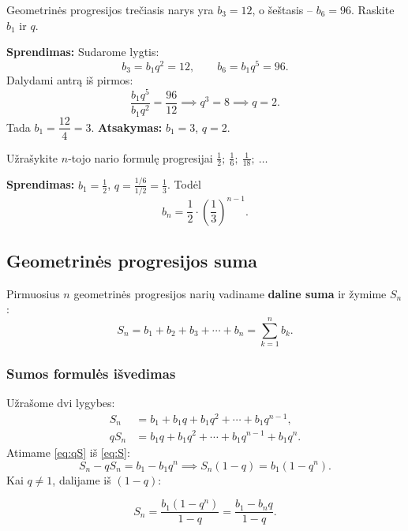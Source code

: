 \begin{exercise}
Geometrinės progresijos trečiasis narys yra $b_3 = 12$, o šeštasis – $b_6 = 96$. Raskite $b_1$ ir $q$.

\textbf{Sprendimas:} Sudarome lygtis:
\[
    b_3 = b_1 q^2 = 12, \qquad b_6 = b_1 q^5 = 96.
\]
Dalydami antrą iš pirmos:
\[
    \frac{b_1 q^5}{b_1 q^2} = \frac{96}{12} \implies q^3 = 8 \implies q = 2.
\]
Tada $b_1 = \dfrac{12}{4} = 3$. \textbf{Atsakymas:} $b_1 = 3$, $q = 2$.
\end{exercise}

\begin{exercise}
Užrašykite $n$-tojo nario formulę progresijai $\tfrac{1}{2};\ \tfrac{1}{6};\ \tfrac{1}{18};\ \ldots$

\textbf{Sprendimas:} $b_1 = \tfrac{1}{2}$, $q = \tfrac{1/6}{1/2} = \tfrac{1}{3}$. Todėl
\[
    b_n = \frac{1}{2} \cdot \left(\frac{1}{3}\right)^{n-1}.
\]
\end{exercise}

\subsection{Geometrinės progresijos suma}

\begin{definition}
Pirmuosius $n$ geometrinės progresijos narių vadiname \textbf{daline suma} ir žymime $S_n$:
\[
    S_n = b_1 + b_2 + b_3 + \cdots + b_n = \sum_{k=1}^{n} b_k.
\]
\end{definition}

\subsubsection*{Sumos formulės išvedimas}

Užrašome dvi lygybes:
\begin{align}
    S_n &= b_1 + b_1 q + b_1 q^2 + \cdots + b_1 q^{n-1}, \label{eq:S}\\
    q S_n &= b_1 q + b_1 q^2 + \cdots + b_1 q^{n-1} + b_1 q^{n}. \label{eq:qS}
\end{align}
Atimame \eqref{eq:qS} iš \eqref{eq:S}:
\[
    S_n - q S_n = b_1 - b_1 q^n \implies S_n(1 - q) = b_1(1 - q^n).
\]
Kai $q \neq 1$, dalijame iš $(1-q)$:

\begin{tcolorbox}[colback=green!5!white, colframe=green!60!black, title=Dalinės sumos formulė ($q \neq 1$)]
\[
    S_n = \frac{b_1(1 - q^n)}{1 - q} = \frac{b_1 - b_n q}{1 - q}.
\]
\end{tcolorbox}

